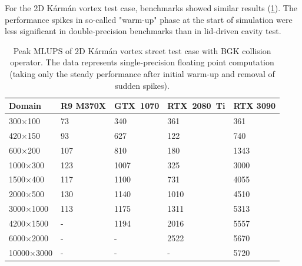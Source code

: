 For the 2D Kármán vortex test case, benchmarks showed similar results (\ref{tab:channel-mlups}). The performance spikes in so-called "warm-up" phase at the start of simulation were less significant in double-precision benchmarks than in lid-driven cavity test. 

\begin{table}[!ht]
	\centering\small
	{\renewcommand{\arraystretch}{1.1}%
		{\setlength{\tabcolsep}{0.5em}
			\begin{tabular}{ |p{2.7cm}||p{2.2cm}|p{2.2cm}|p{2.4cm}|p{2.21cm}|  }
				\hline
				Domain & R9 M370X & GTX~1070 & RTX~2080~Ti & RTX 3090 \\
				\hline
				300$\times$100   & 73 & 340 & 361    & 361  \\
				\hline
				420$\times$150   & 93 & 627 & 122    & 740  \\
				\hline
				600$\times$200   & 107 & 810 & 180    & 1343  \\
				\hline
				1000$\times$300   & 123 & 1007 & 325    & 3000  \\
				\hline
				1500$\times$400   & 117 & 1100 & 731    & 4055  \\
				\hline
				2000$\times$500   & 130 & 1140 & 1010    & 4510  \\
				\hline
				3000$\times$1000   & 113 & 1175 & 1311    & 5313  \\
				\hline
				4200$\times$1500   & - & 1194 & 2016    & 5557  \\
				\hline
				6000$\times$2000   & - & - & 2522  & 5670  \\
				\hline
				10000$\times$3000   & - & - & -   & 5720  \\
				\hline
	\end{tabular}}}
	\caption{Peak MLUPS of 2D Kármán vortex street test case with BGK collision operator. The data represents single-precision floating point computation (taking only the steady performance after initial warm-up and removal of sudden spikes).}
	\label{tab:channel-mlups}
\end{table}


